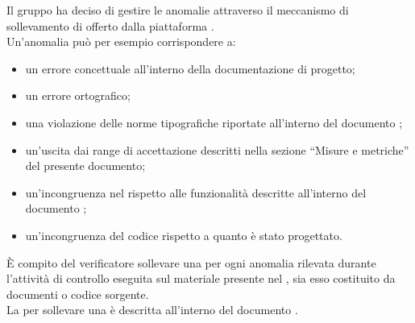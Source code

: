 
		Il gruppo ha deciso di gestire le anomalie attraverso il meccanismo di sollevamento di  offerto dalla piattaforma .\\
		Un'anomalia può per esempio corrispondere a:
		\begin{itemize}
			\item un errore concettuale all'interno della documentazione di progetto;
			\item un errore ortografico;
			\item una violazione delle norme tipografiche riportate all'interno del documento ;
			\item un'uscita dai range di accettazione descritti nella sezione “Misure e metriche” del presente documento;
			\item un'incongruenza nel   rispetto alle funzionalità descritte all'interno del documento ;
			\item un'incongruenza del codice rispetto a quanto è stato progettato.
		\end{itemize}
		È compito del verificatore sollevare una  per ogni anomalia rilevata durante l'attività di controllo eseguita sul materiale presente 
		nel , sia esso costituito da documenti o codice sorgente.\\
		La  per sollevare una  è descritta all'interno del documento .
